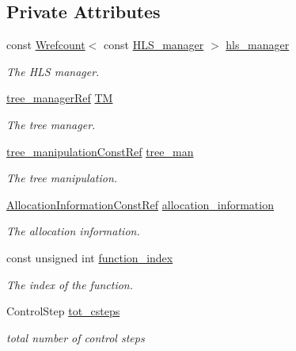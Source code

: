 \subsection*{Private Attributes}
\begin{DoxyCompactItemize}
\item 
const \hyperlink{classWrefcount}{Wrefcount}$<$ const \hyperlink{classHLS__manager}{H\+L\+S\+\_\+manager} $>$ \hyperlink{classSchedule_ac9335f00e46ddb07553a680243fab2b4}{hls\+\_\+manager}
\begin{DoxyCompactList}\small\item\em The H\+LS manager. \end{DoxyCompactList}\item 
\hyperlink{tree__manager_8hpp_a96ff150c071ce11a9a7a1e40590f205e}{tree\+\_\+manager\+Ref} \hyperlink{classSchedule_aee5739d5062edd0854fda0745f270e8a}{TM}
\begin{DoxyCompactList}\small\item\em The tree manager. \end{DoxyCompactList}\item 
\hyperlink{tree__manipulation_8hpp_af8a30f3f306569d7681c1b5af9ddd9d0}{tree\+\_\+manipulation\+Const\+Ref} \hyperlink{classSchedule_a626c40e8391df80cbf334381ae6d1ed9}{tree\+\_\+man}
\begin{DoxyCompactList}\small\item\em The tree manipulation. \end{DoxyCompactList}\item 
\hyperlink{allocation__information_8hpp_a54287618a63bf87e31ddb17ba01e7ca7}{Allocation\+Information\+Const\+Ref} \hyperlink{classSchedule_a864b9407b1dcf3d37b69366be6838e1d}{allocation\+\_\+information}
\begin{DoxyCompactList}\small\item\em The allocation information. \end{DoxyCompactList}\item 
const unsigned int \hyperlink{classSchedule_a51c826c36437ed5ec523725815cc25d0}{function\+\_\+index}
\begin{DoxyCompactList}\small\item\em The index of the function. \end{DoxyCompactList}\item 
Control\+Step \hyperlink{classSchedule_a1d65d93a4de64bed41f252422162f990}{tot\+\_\+csteps}
\begin{DoxyCompactList}\small\item\em total number of control steps \end{DoxyCompactList}\item 

\end{DoxyCompactItemize}
